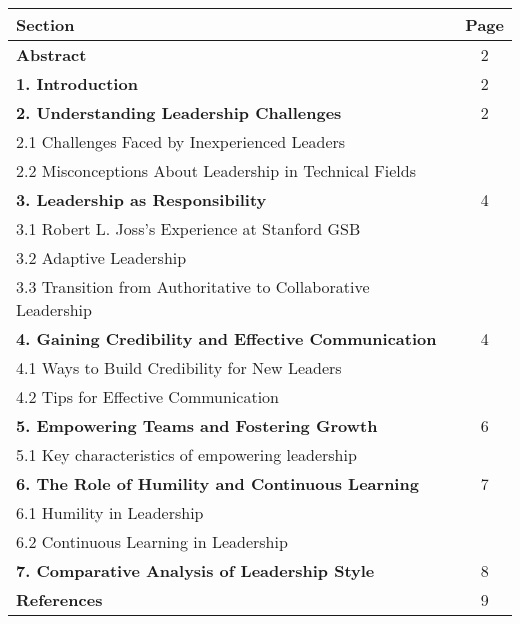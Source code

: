 \documentclass[runningheads]{llncs}
\begin{document}
{\renewcommand{\arraystretch}{1.5} %
\begin{table}[h]
\centering
\begin{tabularx}{\textwidth}{|@{\hspace{2mm}}X|@{\hspace{2mm}}c@{\hspace{2mm}}|}
\hline
\textbf{Section} & \textbf{Page} \\ \hline
\textbf{Abstract} & 2 \\ \hline
\textbf{1. Introduction} & 2 \\ \hline
\textbf{2. Understanding Leadership Challenges} & 2 \\
\hspace{5mm}2.1 Challenges Faced by Inexperienced Leaders & \\
\hspace{5mm}2.2 Misconceptions About Leadership in Technical Fields & \\ \hline
\textbf{3. Leadership as Responsibility} & 4 \\
\hspace{5mm}3.1 Robert L. Joss's Experience at Stanford GSB & \\
\hspace{5mm}3.2 Adaptive Leadership & \\
\hspace{5mm}3.3 Transition from Authoritative to Collaborative Leadership & \\ \hline
\textbf{4. Gaining Credibility and Effective Communication }& 4 \\
\hspace{5mm}4.1 Ways to Build Credibility for New Leaders & \\
\hspace{5mm}4.2 Tips for Effective Communication & \\ \hline
\textbf{5. Empowering Teams and Fostering Growth} & 6 \\
\hspace{5mm}5.1 Key characteristics of empowering leadership & \\ \hline
\textbf{6. The Role of Humility and Continuous Learning }& 7 \\
\hspace{5mm}6.1 Humility in Leadership & \\
\hspace{5mm}6.2 Continuous Learning in Leadership & \\ \hline
\textbf{7. Comparative Analysis of Leadership Style}& 8 \\ \hline
\textbf{References} & 9 \\ \hline
\end{tabularx}
\end{table}
} %
\end{document}
